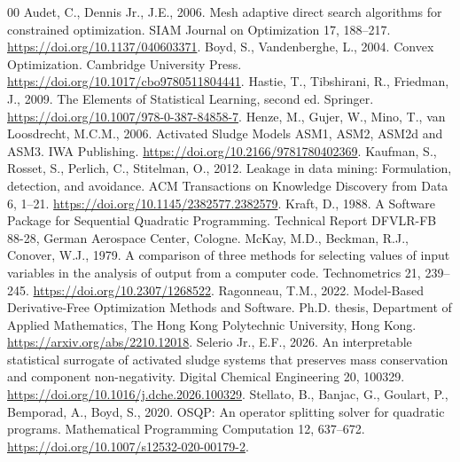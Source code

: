\documentclass[a4paper,fleqn]{cas-sc}
\begin{document}
\begin{thebibliography}{00}
Audet, C., Dennis Jr., J.E., 2006. Mesh adaptive direct search algorithms for constrained optimization. SIAM Journal on Optimization 17, 188--217. \url{https://doi.org/10.1137/040603371}.
Boyd, S., Vandenberghe, L., 2004. Convex Optimization. Cambridge University Press. \url{https://doi.org/10.1017/cbo9780511804441}.
Hastie, T., Tibshirani, R., Friedman, J., 2009. The Elements of Statistical Learning, second ed. Springer. \url{https://doi.org/10.1007/978-0-387-84858-7}.
Henze, M., Gujer, W., Mino, T., van Loosdrecht, M.C.M., 2006. Activated Sludge Models ASM1, ASM2, ASM2d and ASM3. IWA Publishing. \url{https://doi.org/10.2166/9781780402369}.
Kaufman, S., Rosset, S., Perlich, C., Stitelman, O., 2012. Leakage in data mining: Formulation, detection, and avoidance. ACM Transactions on Knowledge Discovery from Data 6, 1--21. \url{https://doi.org/10.1145/2382577.2382579}.
Kraft, D., 1988. A Software Package for Sequential Quadratic Programming. Technical Report DFVLR-FB 88-28, German Aerospace Center, Cologne.
McKay, M.D., Beckman, R.J., Conover, W.J., 1979. A comparison of three methods for selecting values of input variables in the analysis of output from a computer code. Technometrics 21, 239--245. \url{https://doi.org/10.2307/1268522}.
Ragonneau, T.M., 2022. Model-Based Derivative-Free Optimization Methods and Software. Ph.D. thesis, Department of Applied Mathematics, The Hong Kong Polytechnic University, Hong Kong. \url{https://arxiv.org/abs/2210.12018}.
Selerio Jr., E.F., 2026. An interpretable statistical surrogate of activated sludge systems that preserves mass conservation and component non-negativity. Digital Chemical Engineering 20, 100329. \url{https://doi.org/10.1016/j.dche.2026.100329}.
Stellato, B., Banjac, G., Goulart, P., Bemporad, A., Boyd, S., 2020. OSQP: An operator splitting solver for quadratic programs. Mathematical Programming Computation 12, 637--672. \url{https://doi.org/10.1007/s12532-020-00179-2}.

\end{thebibliography}
\end{document}
